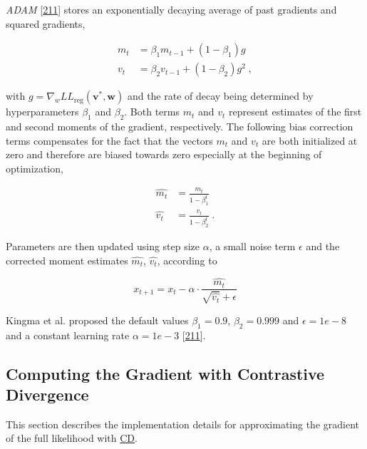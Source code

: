 \documentclass[11pt,a4paper,twoside]{book}
\newcommand{\LLreg}{L\!L_\mathrm{reg}}
\renewcommand{\v}{\mathbf{v}}
\newcommand{\w}{\mathbf{w}}
\theoremstyle{definition}
\theoremstyle{definition}
\theoremstyle{remark}
\begin{document}
\emph{ADAM} {[}\protect\hyperlink{ref-Kingma2014}{211}{]} stores an
exponentially decaying average of past gradients and squared gradients,

\begin{align}
  m_t &= \beta_1 m_{t−1} + (1 − \beta_1) g \\
  v_t &= \beta_2 v_{t−1} + (1 − \beta_2) g^2 \; ,
\end{align}

with \(g = \nabla_w \LLreg(\v^*,\w)\) and the rate of decay being
determined by hyperparameters \(\beta_1\) and \(\beta_2\). Both terms
\(m_t\) and \(v_t\) represent estimates of the first and second moments
of the gradient, respectively. The following bias correction terms
compensates for the fact that the vectors \(m_t\) and \(v_t\) are both
initialized at zero and therefore are biased towards zero especially at
the beginning of optimization,

\begin{align}
  \hat{m_t} &= \frac{m_t}{1-\beta_1^t} \\
  \hat{v_t} &= \frac{v_t}{1-\beta_2^t} \; .
\end{align}

Parameters are then updated using step size \(\alpha\), a small noise
term \(\epsilon\) and the corrected moment estimates \(\hat{m_t}\),
\(\hat{v_t}\), according to

\begin{equation}
  x_{t+1} = x_t - \alpha \cdot \frac{\hat{m_t}}{\sqrt{\hat{v_t}} + \epsilon}
\end{equation}

Kingma et al. proposed the default values \(\beta_1=0.9\),
\(\beta_2=0.999\) and \(\epsilon=1e−8\) and a constant learning rate
\(\alpha=1e-3\) {[}\protect\hyperlink{ref-Kingma2014}{211}{]}.

\subsection{Computing the Gradient with Contrastive
Divergence}\label{methods-cd-sampling}

This section describes the implementation details for approximating the
gradient of the full likelihood with \protect\hyperlink{abbrev}{CD}.
\end{document}
